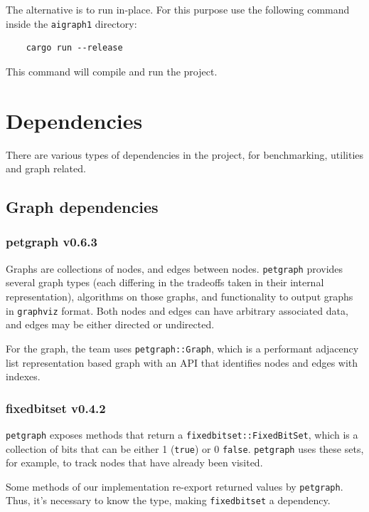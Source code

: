 The alternative is to run in-place. For this purpose use the following command inside the \texttt{aigraph1} directory:

\begin{verbatim}
    cargo run --release
\end{verbatim}

This command will compile and run the project.


\newpage
\section{Dependencies}

There are various types of dependencies in the project, for benchmarking, utilities and graph related.

\subsection{Graph dependencies}

\subsubsection{petgraph v0.6.3}

Graphs are collections of nodes, and edges between nodes. \texttt{petgraph} provides several graph types
(each differing in the tradeoffs taken in their internal representation), algorithms on those graphs,
and functionality to output graphs in \texttt{graphviz} format. Both nodes and edges can have arbitrary associated data,
and edges may be either directed or undirected. \autocite{petgraph}

For the graph, the team uses \texttt{petgraph::Graph}, which is a performant adjacency list representation based graph
with an API that identifies nodes and edges with indexes.

\subsubsection{fixedbitset v0.4.2}

\texttt{petgraph} exposes methods that return a \texttt{fixedbitset::FixedBitSet}, which is a collection of bits that can be either 1 (\texttt{true})
or 0 \texttt{false}. \texttt{petgraph} uses these sets, for example, to track nodes that have already been visited.

Some methods of our implementation re-export returned values by \texttt{petgraph}. Thus, it's necessary to know the type, making
\texttt{fixedbitset} a dependency. \autocite{fixedbitset}


